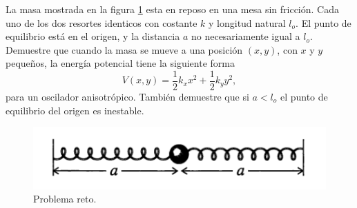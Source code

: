 \begin{mdframed}[style=warning]
	La masa mostrada en la figura \ref{reto} esta en reposo en una mesa sin fricción. Cada uno de los dos resortes identicos con costante $k$ y longitud natural $l_o$. El punto de equilibrio está en el origen, y la distancia $a$ no necesariamente igual a $l_o$. Demuestre que cuando la masa se mueve a una posición $(x,y)$, con $x$ y $y$ pequeños, la energía potencial tiene la siguiente forma
		$$ V(x,y) = \frac{1}{2} k_x x^2 + \frac{1}{2} k_y y^2, $$
	para un oscilador anisotrópico. También demuestre que si $a < l_o$ el punto de equilibrio del origen es inestable.
	\begin{figure}[H]
		\centering
		\includegraphics[scale=0.5]{./img/reto.png}
		\caption{Problema reto.}
		\label{reto}
	\end{figure}
\end{mdframed}






















